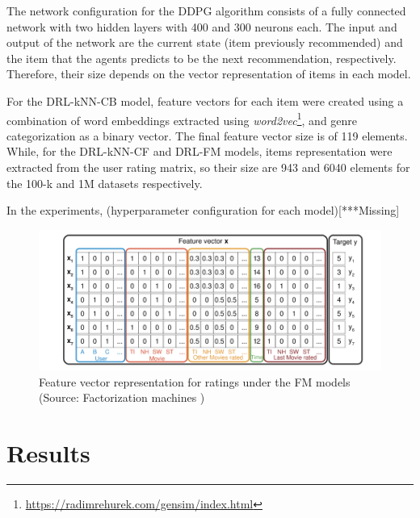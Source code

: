 The network configuration for the DDPG algorithm consists of a fully connected network with two hidden layers with 400 and 300 neurons each. The input and output of the network are the current state (item previously recommended) and the item that the agents predicts to be the next recommendation, respectively. Therefore, their size depends on the vector representation of items in each model.

For the DRL-kNN-CB model, feature vectors for each item were created using a combination of word embeddings extracted using \textit{word2vec}\footnote{\url{https://radimrehurek.com/gensim/index.html}}, and genre categorization as a binary vector. The final feature vector size is of 119 elements. While, for the DRL-kNN-CF and DRL-FM models, items representation were extracted from the user rating matrix, so their size are 943 and 6040 elements for the 100-k and 1M datasets respectively.

In the experiments, (hyperparameter configuration for each model)[***Missing]

\begin{figure}[h]
\centering
\includegraphics[scale=0.9]{images/featurevectors}
\caption[Feature vector representation in the $SVM^{light}$ format]{Feature vector representation for ratings under the FM models (Source: Factorization machines \cite{rendle2010factorization})}
\label{fig:featurevector}
\end{figure}

\section{Results}
